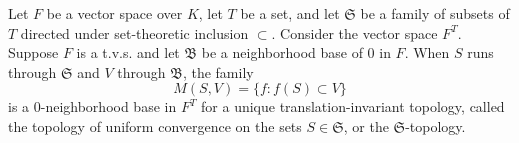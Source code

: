 Let $F$ be a vector space over $K$, let $T$ be a set, and let $\mathfrak{S}$ be a family of subsets of $T$ directed under set-theoretic inclusion $\subset$. Consider the vector space $F^T$. Suppose $F$ is a t.v.s. and let $\mathfrak{B}$ be a neighborhood base of 0 in $F$. When $S$ runs through $\mathfrak{S}$ and $V$ through $\mathfrak{B}$, the family $$M(S, V) = \{ f : f(S) \subset V \}$$ is a 0-neighborhood base in $F^T$ for a unique translation-invariant topology, called the topology of uniform convergence on the sets $S \in \mathfrak{S}$, or the $\mathfrak{S}$-topology.
